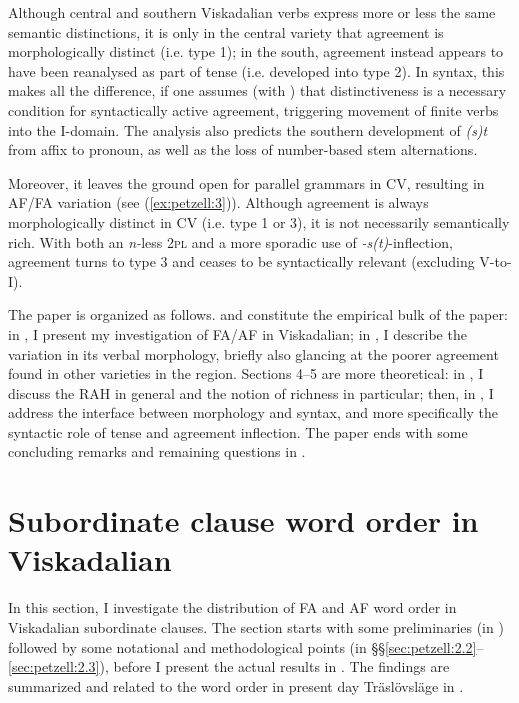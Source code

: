 \documentclass[output=paper,colorlinks,citecolor=brown,draft,draftmode]{langscibook}
\begin{document}
Although central and southern Viskadalian verbs express more or less the same semantic distinctions, it is only in the central variety that agreement is morphologically distinct (i.e. type 1); in the south, agreement instead appears to have been reanalysed as part of tense (i.e. developed into type 2). In syntax, this makes all the difference, if one assumes (with \citealt{BobaljikThrainsson1998}) that distinctiveness is a necessary condition for syntactically active agreement, triggering movement of finite verbs into the I-domain. The analysis also predicts the southern development of \textit{(s)t} from affix to pronoun, as well as the loss of number-based stem alternations. 



Moreover, it leaves the ground open for parallel grammars in CV, resulting in AF/FA variation (see (\ref{ex:petzell:3})). Although agreement is always morphologically distinct in CV (i.e. type 1 or 3), it is not necessarily semantically rich. With both an \textit{n-}less 2\textsc{pl} and a more sporadic use of \textit{-s(t)}-inflection, agreement turns to type 3 and ceases to be syntactically relevant (excluding V-to-I).



The paper is organized as follows.  and  constitute the empirical bulk of the paper: in , I present my investigation of FA/AF in Viskadalian; in , I describe the variation in its verbal morphology, briefly also glancing at the poorer agreement found in other varieties in the region. Sections 4–5 are more theoretical: in , I discuss the RAH in general and the notion of richness in particular; then, in , I address the interface between morphology and syntax, and more specifically the syntactic role of tense and agreement inflection. The paper ends with some concluding remarks and remaining questions in .


\section{Subordinate clause word order in Viskadalian}\label{sec:petzell:2}


In this section, I investigate the distribution of FA and AF word order in Viskadalian subordinate clauses. The section starts with some preliminaries (in ) followed by some notational and methodological points (in §§\ref{sec:petzell:2.2}--\ref{sec:petzell:2.3}), before I present the actual results in . The findings are summarized and related to the word order in present day Träslövsläge in .
\end{document}
